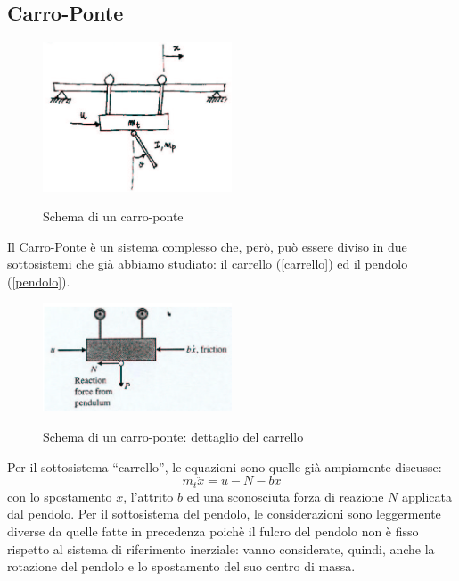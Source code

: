 \documentclass[a4paper]{report}
\begin{document}
\subsection{Carro-Ponte}
\begin{figure}[!h]
  \centering
  \includegraphics[width=0.5\textwidth]{./images/carroponte.png}
  \label{fig:carroponte}
  \caption{Schema di un carro-ponte\label{fig:carroponte}}
\end{figure}
Il Carro-Ponte \`e un sistema complesso che, per\`o, pu\`o essere diviso in due
sottosistemi che gi\`a abbiamo studiato: il carrello (\ref{carrello})
ed il pendolo (\ref{pendolo}).
\begin{figure}[!b]
  \centering
  \includegraphics[width=0.5\textwidth]{./images/carroponte-carrello.png}
  \label{fig:carroponte-carrello}
  \caption{Schema di un carro-ponte: dettaglio del carrello\label{fig:carroponte-carrello}}
\end{figure}
Per il sottosistema ``carrello'', le equazioni sono quelle gi\`a
ampiamente discusse:
\begin{equation}\label{eq:carroponte-carrello}
  m_t \ddot{x} = u - N - b \dot{x}
\end{equation}
con lo spostamento $x$, l'attrito $b$ ed una sconosciuta forza di
reazione $N$ applicata dal pendolo.
Per il sottosistema del pendolo, le considerazioni sono leggermente diverse da
quelle fatte in precedenza poich\`e il fulcro del pendolo non \`e
fisso rispetto al sistema di riferimento inerziale: vanno considerate,
quindi, anche la rotazione del pendolo e lo spostamento del suo centro
di massa.
\end{document}
